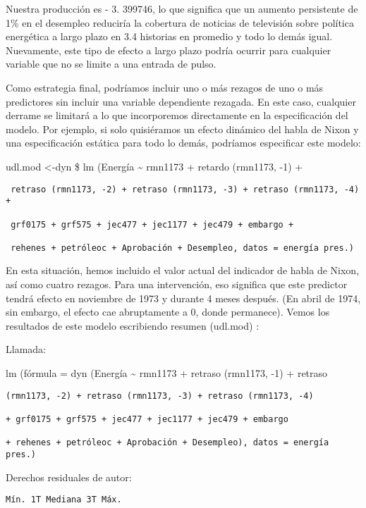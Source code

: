 \documentclass[
]{book}
\begin{document}
Nuestra producción es - 3. 399746, lo que significa que un aumento persistente de 1\% en el desempleo reduciría la cobertura de noticias de televisión sobre política energética a largo plazo en 3.4 historias en promedio y todo lo demás igual. Nuevamente, este tipo de efecto a largo plazo podría ocurrir para cualquier variable que no se limite a una entrada de pulso.

Como estrategia final, podríamos incluir uno o más rezagos de uno o más predictores sin incluir una variable dependiente rezagada. En este caso, cualquier derrame se limitará a lo que incorporemos directamente en la especificación del modelo. Por ejemplo, si solo quisiéramos un efecto dinámico del habla de Nixon y una especificación estática para todo lo demás, podríamos especificar este modelo:

udl.mod \textless-dyn \$ lm (Energía \textasciitilde{} rmn1173 + retardo (rmn1173, -1) +

\begin{verbatim}
 retraso (rmn1173, -2) + retraso (rmn1173, -3) + retraso (rmn1173, -4) +

 grf0175 + grf575 + jec477 + jec1177 + jec479 + embargo +

 rehenes + petróleoc + Aprobación + Desempleo, datos = energía pres.)
\end{verbatim}

En esta situación, hemos incluido el valor actual del indicador de habla de Nixon, así como cuatro rezagos. Para una intervención, eso significa que este predictor tendrá efecto en noviembre de 1973 y durante 4 meses después. (En abril de 1974, sin embargo, el efecto cae abruptamente a 0, donde permanece). Vemos los resultados de este modelo escribiendo resumen (udl.mod) :

Llamada:

lm (fórmula = dyn (Energía \textasciitilde{} rmn1173 + retraso (rmn1173, -1) + retraso

\begin{verbatim}
(rmn1173, -2) + retraso (rmn1173, -3) + retraso (rmn1173, -4)

+ grf0175 + grf575 + jec477 + jec1177 + jec479 + embargo

+ rehenes + petróleoc + Aprobación + Desempleo), datos = energía pres.)
\end{verbatim}

Derechos residuales de autor:

\begin{verbatim}
Mín. 1T Mediana 3T Máx.
\end{verbatim}
\end{document}
